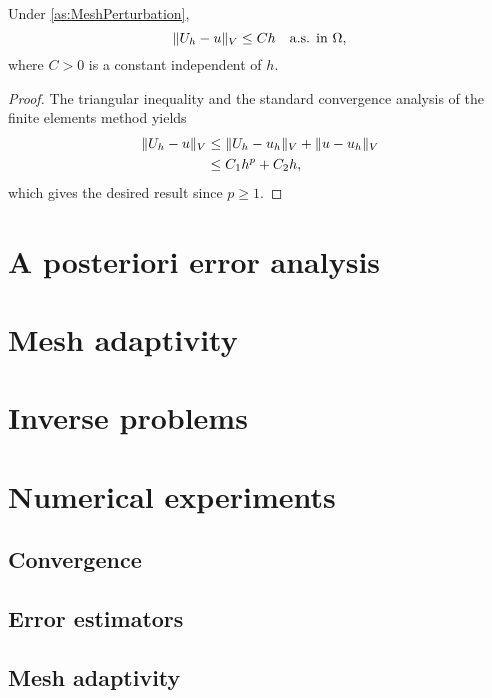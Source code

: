 \documentclass[10pt]{article}
\begin{document}
\begin{theorem} Under \cref{as:MeshPerturbation}, 
	\begin{equation}
		\lVert U_h - u\rVert_V \leq C h \quad \text{a.s. in } \Omega,
	\end{equation}
	where $C > 0$ is a constant independent of $h$.
\end{theorem}

\begin{proof} The triangular inequality and the standard convergence analysis of the finite elements method yields
	\begin{equation}
	\begin{aligned}
		\lVert U_h - u\rVert_V &\leq \lVert U_h - u_h\rVert_V + \lVert u - u_h\rVert_V \\
		&\leq C_1 h^p + C_2 h,
	\end{aligned} 
	\end{equation}
	which gives the desired result since $p \geq 1$.
\end{proof}

\section{A posteriori error analysis}
\section{Mesh adaptivity}
\section{Inverse problems}

\section{Numerical experiments}

\subsection{Convergence}

\subsection{Error estimators}

\subsection{Mesh adaptivity}





\end{document}
